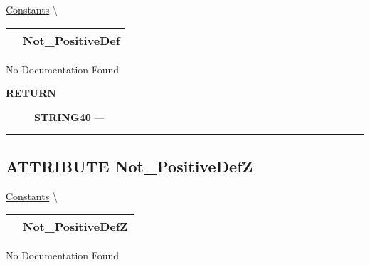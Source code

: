 \hypertarget{ecldoc:pbblas.constants.not_positivedef}{}
\hspace{0pt} \hyperlink{ecldoc:PBblas.Constants}{Constants} \textbackslash 

{\renewcommand{\arraystretch}{1.5}
\begin{tabularx}{\textwidth}{|>{\raggedright\arraybackslash}l|X|}
\hline
\hspace{0pt}\mytexttt{\color{red} } & \textbf{Not\_PositiveDef} \\
\hline
\end{tabularx}
}

\par





No Documentation Found








\par
\begin{description}
\item [\colorbox{tagtype}{\color{white} \textbf{\textsf{RETURN}}}] \textbf{STRING40} --- 
\end{description}




\rule{\linewidth}{0.5pt}
\subsection*{\textsf{\colorbox{headtoc}{\color{white} ATTRIBUTE}
Not\_PositiveDefZ}}

\hypertarget{ecldoc:pbblas.constants.not_positivedefz}{}
\hspace{0pt} \hyperlink{ecldoc:PBblas.Constants}{Constants} \textbackslash 

{\renewcommand{\arraystretch}{1.5}
\begin{tabularx}{\textwidth}{|>{\raggedright\arraybackslash}l|X|}
\hline
\hspace{0pt}\mytexttt{\color{red} } & \textbf{Not\_PositiveDefZ} \\
\hline
\end{tabularx}
}

\par





No Documentation Found








